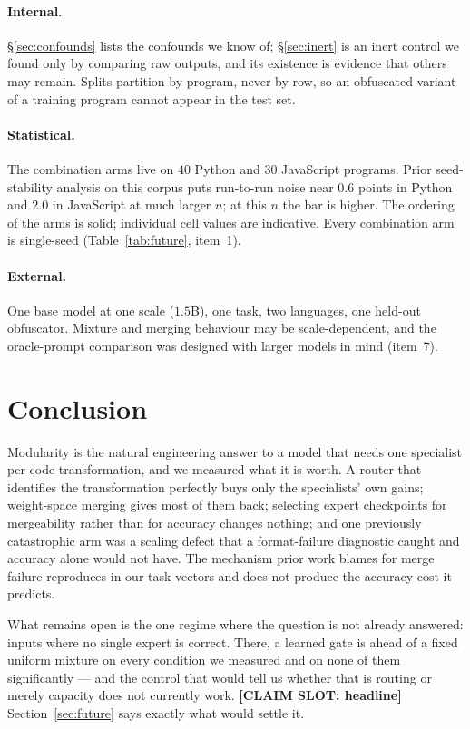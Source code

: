 \documentclass[sigconf,review,anonymous]{acmart}
\newcommand{\slot}[1]{\textbf{[CLAIM SLOT: #1]}}
\begin{document}
\paragraph{Internal.} \S\ref{sec:confounds} lists the confounds we know of; \S\ref{sec:inert} is
an inert control we found only by comparing raw outputs, and its existence is evidence that
others may remain. Splits partition by program, never by row, so an obfuscated variant of a
training program cannot appear in the test set.

\paragraph{Statistical.} The combination arms live on $40$ Python and $30$ JavaScript programs.
Prior seed-stability analysis on this corpus puts run-to-run noise near $0.6$ points in Python
and $2.0$ in JavaScript at much larger $n$; at this $n$ the bar is higher. The ordering of the
arms is solid; individual cell values are indicative. Every combination arm is single-seed
(Table~\ref{tab:future}, item~1).

\paragraph{External.} One base model at one scale ($1.5$B), one task, two languages, one
held-out obfuscator. Mixture and merging behaviour may be scale-dependent, and the oracle-prompt
comparison was designed with larger models in mind (item~7).

\section{Conclusion}

Modularity is the natural engineering answer to a model that needs one specialist per code
transformation, and we measured what it is worth. A router that identifies the transformation
perfectly buys only the specialists' own gains; weight-space merging gives most of them back;
selecting expert checkpoints for mergeability rather than for accuracy changes nothing; and one
previously catastrophic arm was a scaling defect that a format-failure diagnostic caught and
accuracy alone would not have. The mechanism prior work blames for merge failure reproduces in
our task vectors and does not produce the accuracy cost it predicts.

What remains open is the one regime where the question is not already answered: inputs where no
single expert is correct. There, a learned gate is ahead of a fixed uniform mixture on every
condition we measured and on none of them significantly --- and the control that would tell us
whether that is routing or merely capacity does not currently work. \slot{headline}
Section~\ref{sec:future} says exactly what would settle it.



\end{document}
